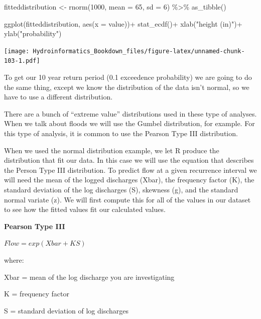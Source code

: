 \documentclass[
]{book}
\newenvironment{Shaded}{\begin{snugshade}}{\end{snugshade}}
\newcommand{\AttributeTok}[1]{\textcolor[rgb]{0.77,0.63,0.00}{#1}}
\newcommand{\DecValTok}[1]{\textcolor[rgb]{0.00,0.00,0.81}{#1}}
\newcommand{\FunctionTok}[1]{\textcolor[rgb]{0.00,0.00,0.00}{#1}}
\newcommand{\NormalTok}[1]{#1}
\newcommand{\OtherTok}[1]{\textcolor[rgb]{0.56,0.35,0.01}{#1}}
\newcommand{\SpecialCharTok}[1]{\textcolor[rgb]{0.00,0.00,0.00}{#1}}
\newcommand{\StringTok}[1]{\textcolor[rgb]{0.31,0.60,0.02}{#1}}
\begin{document}
\begin{Shaded}
\begin{Highlighting}[]
\NormalTok{fitteddistribution }\OtherTok{\textless{}{-}} \FunctionTok{rnorm}\NormalTok{(}\DecValTok{1000}\NormalTok{, }\AttributeTok{mean =} \DecValTok{65}\NormalTok{, }\AttributeTok{sd =} \DecValTok{6}\NormalTok{) }\SpecialCharTok{\%\textgreater{}\%}
  \FunctionTok{as\_tibble}\NormalTok{()}

\FunctionTok{ggplot}\NormalTok{(fitteddistribution, }\FunctionTok{aes}\NormalTok{(}\AttributeTok{x =}\NormalTok{ value))}\SpecialCharTok{+}
  \FunctionTok{stat\_ecdf}\NormalTok{()}\SpecialCharTok{+}
  \FunctionTok{xlab}\NormalTok{(}\StringTok{"height (in)"}\NormalTok{)}\SpecialCharTok{+}
  \FunctionTok{ylab}\NormalTok{(}\StringTok{"probability"}\NormalTok{)}
\end{Highlighting}
\end{Shaded}

\texttt{[image: Hydroinformatics\_Bookdown\_files/figure-latex/unnamed-chunk-103-1.pdf]}

To get our 10 year return period (0.1 exceedence probability) we are going to do the same thing, except we know the distribution of the data isn't normal, so we have to use a different distribution.

There are a bunch of ``extreme value'' distributions used in these type of analyses. When we talk about floods we will use the Gumbel distribution, for example. For this type of analysis, it is common to use the Pearson Type III distribution.

When we used the normal distribution example, we let R produce the distribution that fit our data. In this case we will use the equation that describes the Person Type III distribution. To predict flow at a given recurrence interval we will need the mean of the logged discharges (Xbar), the frequency factor (K), the standard deviation of the log discharges (S), skewness (g), and the standard normal variate (z). We will first compute this for all of the values in our dataset to see how the fitted values fit our calculated values.

\textbf{Pearson Type III}

\(Flow = exp(Xbar + KS)\)

where:

Xbar = mean of the log discharge you are investigating

K = frequency factor

S = standard deviation of log discharges
\end{document}
